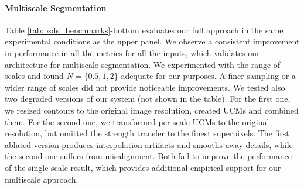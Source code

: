 \documentclass[10pt,journal,cspaper,compsoc]{IEEEtran}
\begin{document}


\paragraph*{\textbf{Multiscale Segmentation}}
Table \ref{tab:bsds_benchmarks}-bottom evaluates our full approach in the same experimental conditions as the upper panel. 
We observe a consistent improvement in performance in all the metrics for all the inputs, which validates our architecture for multiscale segmentation.  
We experimented with the range of scales and found $N=\{0.5, 1, 2\}$ adequate for our purposes. A finer sampling or a wider range of scales did not provide noticeable improvements.  
We tested also two degraded versions of our system (not shown in the table). For the first one, we resized contours to the original image resolution, created UCMs and combined them. 
For the second one, we transformed per-scale UCMs to the original resolution, but omitted the strength transfer to the finest superpixels. 
The first ablated version produces interpolation artifacts and smooths away details, while the second one suffers from misalignment. 
Both fail to improve the performance of the single-scale result, which provides additional empirical support for our multiscale approach. 
\end{document}
